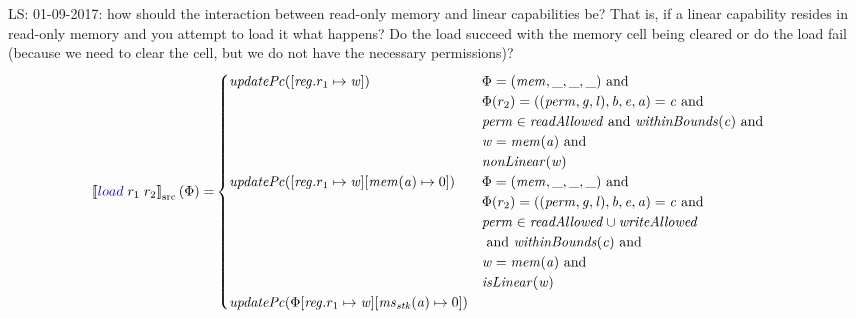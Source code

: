\documentclass[a4paper]{article}
\newcommand\lau[1]{{\color{purple} \sf \footnotesize {LS: #1}}\\}
\newcommand{\sem}[1]{\left\llbracket #1 \right\rrbracket}
\newcommand{\ssem}[2][\Phi]{\sem{#2}_{\mathrm{src}}(#1)}
\newcommand{\tand}{\text{ and }}
\newcommand{\sourcecolor}[1]{\color{blue}}
\newcommand{\src}[1]{{\sourcecolor{} #1}}
\newcommand{\zinstr}[1]{#1}
\newcommand{\twoinstr}[3]{
  \ifthenelse{\equal{#2#3}{}}
  {\zinstr{#1}}
  {\zinstr{#1} \; #2 \; #3}
}
\newcommand{\sload}[2]{\twoinstr{\src{load}}{#1}{#2}}
\newcommand{\update}[2]{[#1 \mapsto #2]}
\newcommand{\perm}{\var{perm}}
\newcommand{\gl}{\var{g}}
\newcommand{\lin}{\var{l}}
\newcommand{\var}[1]{\mathit{#1}}
\newcommand{\reg}{\var{reg}}
\newcommand{\mem}{\var{mem}}
\newcommand{\ms}{\var{ms}}
\newcommand{\stk}{\var{stk}}
\newcommand{\baddr}{\var{b}}
\newcommand{\eaddr}{\var{e}}
\newcommand{\aaddr}{\var{a}}
\newcommand{\plainfun}[2]{
  \ifthenelse{\equal{#2}{}}
  {\mathit{#1}}
  {\mathit{#1}(#2)}
}
\newcommand{\updPcAddr}[1]{\plainfun{updatePc}{#1}}
\newcommand{\readAllowed}[1]{\plainfun{readAllowed}{#1}}
\newcommand{\writeAllowed}[1]{\plainfun{writeAllowed}{#1}}
\newcommand{\nonLinear}[1]{\plainfun{nonLinear}{#1}}
\newcommand{\isLinear}[1]{\plainfun{isLinear}{#1}}
\newcommand{\withinBounds}[1]{\plainfun{withinBounds}{#1}}
\begin{document}
\lau{01-09-2017: how should the interaction between read-only memory and linear capabilities be? That is, if a linear capability resides in read-only memory and you attempt to load it what happens? Do the load succeed with the memory cell being cleared or do the load fail (because we need to clear the cell, but we do not have the necessary permissions)? }
\begin{align*}
  \ssem{\sload{r_1}{r_2}} = & 
                              \begin{cases}
                                \updPcAddr{\update{\reg.r_1}{\var{w}}} &
                                \arraycolsep=0pt
                                \begin{array}[t]{l}
                                  \Phi = (\mem, \_, \_, \_) \tand \\
                                  \Phi(r_2) = ((\perm,\gl,\lin),\baddr,\eaddr,\aaddr) = \var{c} \tand\\
                                  \perm \in \readAllowed{} \tand \withinBounds{\var{c}} \tand \\
                                  \var{w} = \mem(\aaddr) \tand \\
                                  \nonLinear{\var{w}}
                                \end{array}\\
                                \updPcAddr{\update{\reg.r_1}{\var{w}}\update{\mem(\aaddr)}{0}} &
                                \arraycolsep=0pt
                                \begin{array}[t]{l}
                                  \Phi = (\mem, \_, \_, \_) \tand \\
                                  \Phi(r_2) = ((\perm,\gl,\lin),\baddr,\eaddr,\aaddr) = \var{c} \tand\\
                                  \perm \in \readAllowed{} \cup \writeAllowed{} \\
                                  \tand \withinBounds{\var{c}} \tand \\
                                  \var{w} = \mem(\aaddr) \tand \\
                                  \isLinear{\var{w}}
                                \end{array}\\
                                \updPcAddr{\Phi\update{\reg.r_1}{\var{w}}\update{\ms_\stk(\aaddr)}{0}} & 
                                \arraycolsep=0pt

\end{cases}
\end{align*}
\end{document}
